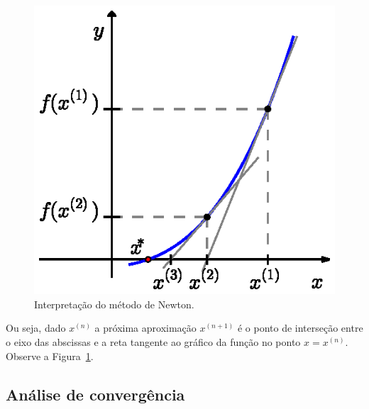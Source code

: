\begin{figure}[h]
  \centering
  \includegraphics{./cap_equacao1d/pics/metodo_de_Newton/metodo_de_Newton.eps}  
  \caption{Interpretação do método de Newton.}
  \label{fig:metodo_de_Newton}
\end{figure}

Ou seja, dado $x^{(n)}$ a próxima aproximação $x^{(n+1)}$ é o ponto de interseção entre o eixo das abscissas e a reta tangente ao gráfico da função no ponto $x = x^{(n)}$. Observe a Figura~\ref{fig:metodo_de_Newton}.

\subsection{Análise de convergência}

